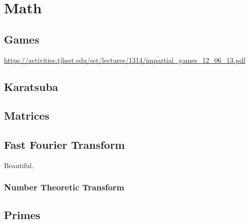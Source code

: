 \documentclass[11pt]{book}
\begin{document}
\chapter{Math}

\section{Games}

\url{https://activities.tjhsst.edu/sct/lectures/1314/impartial_games_12_06_13.pdf}

\section{Karatsuba}

\section{Matrices}

\section{Fast Fourier Transform}

Beautiful.

\subsection{Number Theoretic Transform}

\section{Primes}
\end{document}
